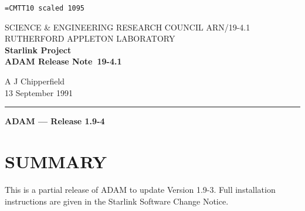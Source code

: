 \pagestyle{myheadings}

\newcommand{\stardoccategory}  {ADAM Release Note}
\newcommand{\stardocinitials}  {ARN}
\newcommand{\stardocnumber}    {19-4.1}
\newcommand{\stardocauthors}   {A J Chipperfield}
\newcommand{\stardocdate}      {13 September 1991}
\newcommand{\stardoctitle}     {ADAM --- Release 1.9-4}

\newcommand{\stardocname}{\stardocinitials /\stardocnumber}
\markright{\stardocname}
\setlength{\textwidth}{160mm}
\setlength{\textheight}{240mm}
\setlength{\topmargin}{-5mm}
\setlength{\oddsidemargin}{0mm}
\setlength{\evensidemargin}{0mm}
\setlength{\parindent}{0mm}
\setlength{\parskip}{\medskipamount}
\setlength{\unitlength}{1mm}


\font\tt=CMTT10 scaled 1095
\renewcommand{\_}{{\tt\char'137}}


\thispagestyle{empty}
SCIENCE \& ENGINEERING RESEARCH COUNCIL \hfill \stardocname\\
RUTHERFORD APPLETON LABORATORY\\
{\large\bf Starlink Project\\}
{\large\bf \stardoccategory\ \stardocnumber}
\begin{flushright}
\stardocauthors\\
\stardocdate
\end{flushright}
\vspace{-4mm}
\rule{\textwidth}{0.5mm}
\vspace{5mm}
\begin{center}
{\Large\bf \stardoctitle}
\end{center}
\vspace{5mm}

\section{SUMMARY}
This is a partial release of ADAM to update Version 1.9-3. 
Full installation instructions are given in the Starlink Software 
Change Notice.

